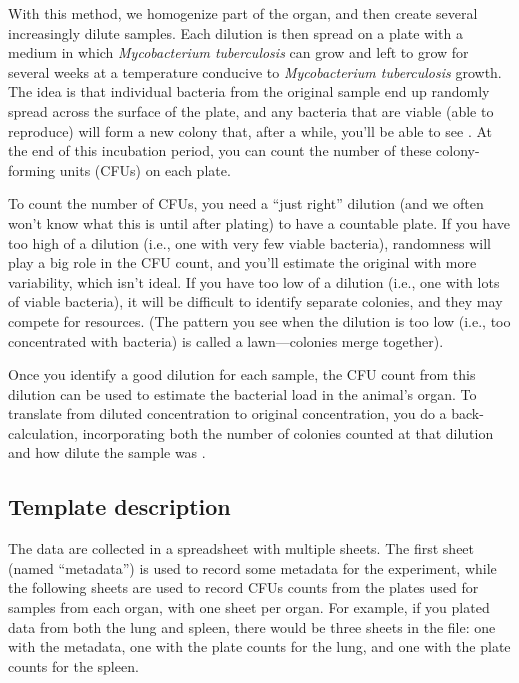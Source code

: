 \documentclass[
]{book}
\begin{document}
With this method, we homogenize part of the organ, and then create several
increasingly dilute samples. Each dilution is then spread on a plate with a
medium in which \emph{Mycobacterium tuberculosis} can grow and left to grow for
several weeks at a temperature conducive to \emph{Mycobacterium tuberculosis} growth.
The idea is that individual bacteria from the original sample end up randomly
spread across the surface of the plate, and any bacteria that are viable
(able to reproduce) will form a new colony that, after a while, you'll be able
to see \citep{wilson1922proportion, goldman2015practical}. At the end of this
incubation period, you can count the number of these colony-forming units
(CFUs) on each plate.

To count the number of CFUs, you need a ``just right'' dilution (and
we often won't know what this is until after plating) to have a countable
plate. If you have too high of a dilution (i.e., one with very few viable
bacteria), randomness will play a big role in the CFU count, and you'll estimate
the original with more variability, which isn't ideal. If you have too low
of a dilution (i.e., one with lots of viable bacteria), it will be difficult to
identify separate colonies, and they may compete for resources. (The pattern
you see when the dilution is too low (i.e., too concentrated with bacteria) is
called a lawn---colonies merge together).

Once you identify a good dilution for each sample, the CFU count from this
dilution can be used to estimate the bacterial load in the animal's organ. To
translate from diluted concentration to original concentration, you do a
back-calculation, incorporating both the number of colonies counted at that
dilution and how dilute the sample was \citep{ben2014estimation, goldman2015practical}.

\subsection{Template description}\label{template-description-1}

The data are collected in a spreadsheet with multiple sheets. The first sheet
(named ``metadata'') is used to record some metadata for the experiment, while the
following sheets are used to record CFUs counts from the plates used for samples
from each organ, with one sheet per organ. For example, if you plated data
from both the lung and spleen, there would be three sheets in the file: one
with the metadata, one with the plate counts for the lung, and one with the
plate counts for the spleen.
\end{document}
